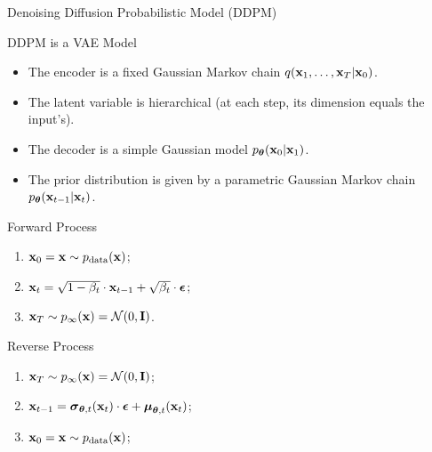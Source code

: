 \documentclass{beamer}
\renewcommand{\eqpause}{}
\begin{document}
\begin{frame}{Denoising Diffusion Probabilistic Model (DDPM)}
    \begin{block}{DDPM is a VAE Model}
        \begin{itemize}
            \item The encoder is a fixed Gaussian Markov chain $q(\mathbf{x}_1, \dots, \mathbf{x}_T | \mathbf{x}_0)$.
            \item The latent variable is hierarchical (at each step, its dimension equals the input's).
            \item The decoder is a simple Gaussian model $p_{\boldsymbol{\theta}}(\mathbf{x}_0 | \mathbf{x}_1)$.
            \item The prior distribution is given by a parametric Gaussian Markov chain $p_{\boldsymbol{\theta}}(\mathbf{x}_{t-1} | \mathbf{x}_t)$.
        \end{itemize}
    \end{block}
    \eqpause
    \begin{minipage}{0.5\linewidth}
        \begin{block}{Forward Process}
            \begin{enumerate}
                \item $\mathbf{x}_0 = \mathbf{x} \sim p_{\text{data}}(\mathbf{x})$;
                \item $\mathbf{x}_t = \sqrt{1 - \beta_t} \cdot \mathbf{x}_{t - 1} + \sqrt{\beta_t} \cdot \boldsymbol{\epsilon}$;
                \item $\mathbf{x}_T \sim p_{\infty}(\mathbf{x}) = \mathcal{N}(0, \mathbf{I})$.
            \end{enumerate}
        \end{block}
    \end{minipage}%
    \eqpause
    \begin{minipage}{0.55\linewidth}
        \begin{block}{Reverse Process}
            \begin{enumerate}
                \item $\mathbf{x}_T \sim p_{\infty}(\mathbf{x}) = \mathcal{N}(0, \mathbf{I})$;
                \item $\mathbf{x}_{t - 1} = \boldsymbol{\sigma}_{\boldsymbol{\theta}, t}(\mathbf{x}_t) \cdot \boldsymbol{\epsilon} + \boldsymbol{\mu}_{\boldsymbol{\theta}, t}(\mathbf{x}_t)$;
                \item $\mathbf{x}_0 = \mathbf{x} \sim p_{\text{data}}(\mathbf{x})$;
            \end{enumerate}
        \end{block}
    \end{minipage}
\end{frame}
\end{document}
